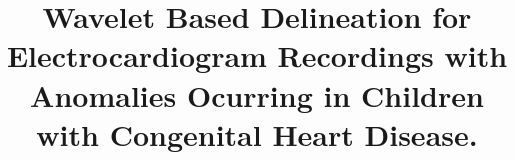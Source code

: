 \documentclass[conference,compsoc]{IEEEtran}
\begin{document}
%
\title{Wavelet Based Delineation for Electrocardiogram Recordings with Anomalies Ocurring in Children with Congenital Heart Disease.}


\author{
}


% 




\end{document}
